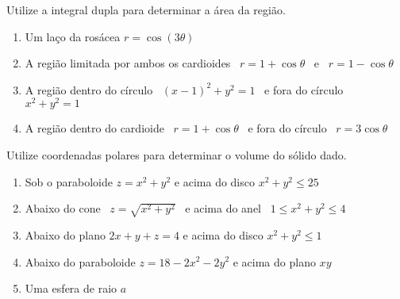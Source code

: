 	\vspace{5mm}
	
	Utilize a integral dupla para determinar a área da região.
	
	\begin{enumerate}[resume]
	
		\item Um laço da rosácea $r = \cos(3\theta)$
		
		\item A região limitada por ambos os cardioides \, $r = 1 + \cos\theta$ \, e \, $r = 1 - \cos\theta$
		
		\item A região dentro do círculo \, $(x-1)^2 + y^2 = 1$ \, e fora do círculo \, $x^2 + y^2 = 1$
		
		\item A região dentro do cardioide \, $r = 1 + \cos\theta$ \, e fora do círculo \, $r = 3\cos\theta$
	
	\end{enumerate}
	
	\vspace{5mm}
	
	Utilize coordenadas polares para determinar o volume do sólido dado.
	
	\begin{enumerate}[resume]
	
		\item Sob o paraboloide $z = x^2 + y^2$ e acima do disco $x^2 + y^2 \leq 25$
		
		\item Abaixo do cone \, $z = \sqrt{x^2 + y^2}$ \, e acima do anel \, $1 \leq x^2 + y^2 \leq 4$
		
		\item Abaixo do plano $2x + y + z = 4$ e acima do disco $x^2 + y^2 \leq 1$
		\resposta{$4\pi$}
		
		\item Abaixo do paraboloide $z = 18 - 2x^2 - 2y^2$ e acima do plano $xy$
		\resposta{$81\pi$}
		
		\item Uma esfera de raio $a$
	
	\end{enumerate}
			
	\vspace{5mm}	
	
	



